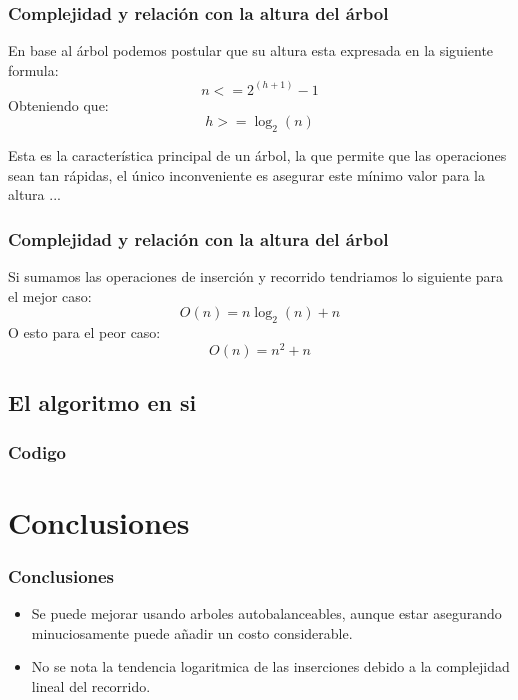 \documentclass{beamer}
\begin{document}
		\begin{frame}
			\frametitle{Complejidad y relación con la altura del árbol}
			En base al árbol podemos postular que su altura esta expresada en la siguiente formula:
				\begin{equation}
					n < = 2^{(h + 1)} - 1
				\end{equation}
				Obteniendo que:
				\begin{equation}
					h >= \log_2{(n)}
				\end{equation}
				
			Esta es la característica principal de un árbol, la que permite que las operaciones sean tan rápidas, el único inconveniente es asegurar este mínimo valor para la altura ...
		\end{frame}
		
		\begin{frame}
			\frametitle{Complejidad y relación con la altura del árbol}
			Si sumamos las operaciones de inserción y recorrido tendriamos lo siguiente para el mejor caso:
			\begin{equation}
				O(n) = n  \log_2{(n)} + n
			\end{equation}
			O esto para el peor caso:
			\begin{equation}
				O(n) = n^2 + n
			\end{equation}
		\end{frame}

		\subsection{El algoritmo en si}

			\begin{frame}
				\frametitle{Codigo}
				
			\end{frame}

\section{Conclusiones}

	\begin{frame}
		\frametitle{Conclusiones}
			\begin{itemize}[<+->]
				\item Se puede mejorar usando arboles autobalanceables, aunque estar asegurando minuciosamente puede añadir un costo considerable.
				\item No se nota la tendencia logaritmica de las inserciones debido a la complejidad lineal del recorrido.
			\end{itemize}
	\end{frame}
\end{document}
